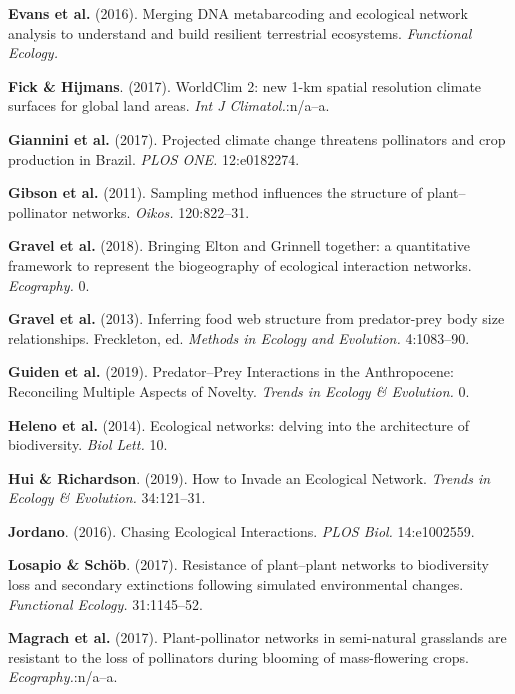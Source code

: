 \leavevmode\hypertarget{ref-EvanKits16}{}%
\textbf{Evans et al.} (2016). Merging DNA metabarcoding and ecological
network analysis to understand and build resilient terrestrial
ecosystems. \emph{Functional Ecology.}

\leavevmode\hypertarget{ref-FickHijm17}{}%
\textbf{Fick \& Hijmans}. (2017). WorldClim 2: new 1-km spatial
resolution climate surfaces for global land areas. \emph{Int J
Climatol.}:n/a--a.

\leavevmode\hypertarget{ref-GianCost17}{}%
\textbf{Giannini et al.} (2017). Projected climate change threatens
pollinators and crop production in Brazil. \emph{PLOS ONE.} 12:e0182274.

\leavevmode\hypertarget{ref-GibsKnot11}{}%
\textbf{Gibson et al.} (2011). Sampling method influences the structure
of plant--pollinator networks. \emph{Oikos.} 120:822--31.

\leavevmode\hypertarget{ref-GravBais18}{}%
\textbf{Gravel et al.} (2018). Bringing Elton and Grinnell together: a
quantitative framework to represent the biogeography of ecological
interaction networks. \emph{Ecography.} 0.

\leavevmode\hypertarget{ref-GravPois13}{}%
\textbf{Gravel et al.} (2013). Inferring food web structure from
predator-prey body size relationships. Freckleton, ed. \emph{Methods in
Ecology and Evolution.} 4:1083--90.

\leavevmode\hypertarget{ref-GuidBart19}{}%
\textbf{Guiden et al.} (2019). Predator--Prey Interactions in the
Anthropocene: Reconciling Multiple Aspects of Novelty. \emph{Trends in
Ecology \& Evolution.} 0.

\leavevmode\hypertarget{ref-HeleGarc14}{}%
\textbf{Heleno et al.} (2014). Ecological networks: delving into the
architecture of biodiversity. \emph{Biol Lett.} 10.

\leavevmode\hypertarget{ref-HuiRich19}{}%
\textbf{Hui \& Richardson}. (2019). How to Invade an Ecological Network.
\emph{Trends in Ecology \& Evolution.} 34:121--31.

\leavevmode\hypertarget{ref-Jord16}{}%
\textbf{Jordano}. (2016). Chasing Ecological Interactions. \emph{PLOS
Biol.} 14:e1002559.

\leavevmode\hypertarget{ref-LosaScho17}{}%
\textbf{Losapio \& Schöb}. (2017). Resistance of plant--plant networks
to biodiversity loss and secondary extinctions following simulated
environmental changes. \emph{Functional Ecology.} 31:1145--52.

\leavevmode\hypertarget{ref-MagrHolz17}{}%
\textbf{Magrach et al.} (2017). Plant-pollinator networks in
semi-natural grasslands are resistant to the loss of pollinators during
blooming of mass-flowering crops. \emph{Ecography.}:n/a--a.

